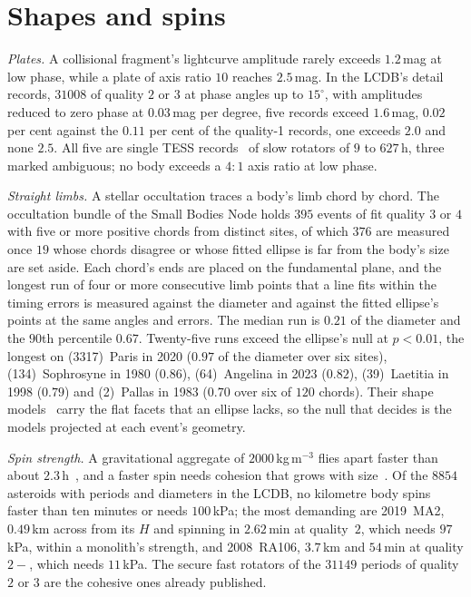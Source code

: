 \documentclass[3p,11pt]{elsarticle}
\begin{document}
\section{Shapes and spins}\label{sec:shapes}

\emph{Plates.} A collisional fragment's lightcurve amplitude rarely exceeds $1.2$\,mag at
low phase, while a plate of axis ratio $10$ reaches $2.5$\,mag. In the LCDB's detail
records, $31008$ of quality $2$ or $3$ at phase angles up to $15^\circ$, with amplitudes
reduced to zero phase at $0.03$\,mag per degree, five records exceed $1.6$\,mag, $0.02$
per cent against the $0.11$ per cent of the quality-1 records, one exceeds $2.0$ and none
$2.5$. All five are single TESS records~\cite{Pal2020} of slow rotators of $9$ to $627$\,h,
three marked ambiguous; no body exceeds a $4:1$ axis ratio at low phase.

\emph{Straight limbs.} A stellar occultation traces a body's limb chord by chord. The
occultation bundle of the Small Bodies Node holds $395$ events of fit quality $3$ or $4$
with five or more positive chords from distinct sites, of which $376$ are measured once
$19$ whose chords disagree or whose fitted ellipse is far from the body's size are set
aside. Each chord's ends are placed on the fundamental plane, and the longest run of
four or more consecutive limb points that a
line fits within the timing errors is measured against the diameter and against the
fitted ellipse's points at the same angles and errors. The median run is $0.21$ of the
diameter and the $90$th percentile $0.67$. Twenty-five runs exceed the ellipse's null at
$p<0.01$, the longest on (3317)~Paris in 2020 ($0.97$ of the diameter over six sites),
(134)~Sophrosyne in 1980 ($0.86$), (64)~Angelina in 2023 ($0.82$), (39)~Laetitia in 1998
($0.79$) and (2)~Pallas in 1983 ($0.70$ over six of $120$ chords). Their shape
models~\cite{Durech2010} carry the flat facets that an ellipse lacks, so the null that
decides is the models projected at each event's geometry.

\emph{Spin strength.} A gravitational aggregate of $2000$\,kg\,m$^{-3}$ flies apart
faster than about $2.3$\,h~\cite{Pravec2000}, and a faster spin needs cohesion that grows
with size~\cite{Holsapple2007}. Of the $8854$ asteroids with periods and diameters in the
LCDB, no kilometre body spins faster than ten minutes or needs $100$\,kPa; the most
demanding are 2019~MA2, $0.49$\,km across from its $H$ and spinning in $2.62$\,min at
quality~$2$, which needs $97$\,kPa, within a monolith's strength, and 2008~RA106,
$3.7$\,km and $54$\,min at quality $2-$, which needs $11$\,kPa. The secure fast rotators
of the $31149$ periods of quality $2$ or $3$ are the cohesive ones already published.
\end{document}
